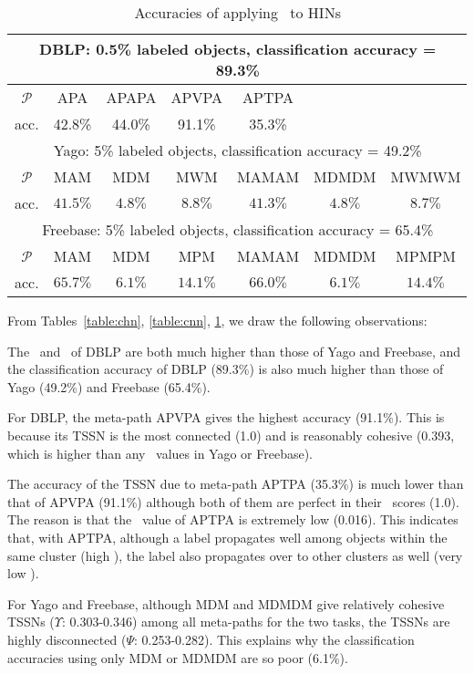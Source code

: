 \begin{table}
\caption{Accuracies of applying \gm\ to HINs}
\centering
\tiny
\begin{tabular}{|c|c|c|c|c|c|c|}  \hline
\multicolumn{7}{|c|}{DBLP: 0.5\% labeled objects, classification accuracy = 89.3\%}  \\ \hline
$\mathcal{P}$ & APA & APAPA & APVPA & APTPA  & & \\ \hline
acc. &42.8\% &44.0\% & 91.1\% & 35.3\% & & \\ \hline \hline
\multicolumn{7}{|c|}{Yago: 5\% labeled objects, classification accuracy = 49.2\%}  \\ \hline
$\mathcal{P}$ & MAM & MDM & MWM & MAMAM  & MDMDM & MWMWM  \\ \hline
acc. & $41.5\%$ & $4.8\%$ & $8.8\%$ & $41.3\%$ & $4.8\%$ & $8.7\%$  \\ \hline \hline
\multicolumn{7}{|c|}{Freebase: 5\% labeled objects, classification accuracy = 65.4\%}  \\ \hline
$\mathcal{P}$ & MAM & MDM & MPM & MAMAM & MDMDM & MPMPM \\ \hline
acc. &  $65.7\%$ & $6.1\%$ & $14.1\%$ & $66.0\%$ & $6.1\%$ & $14.4\%$ \\ \hline
\end{tabular}
\label{table:acc}
\end{table}

From Tables~\ref{table:chn}, \ref{table:cnn}, \ref{table:acc}, we draw the following observations:

 The \chn\ and \cnn\ of DBLP are both much higher than those of Yago and Freebase, and
the classification accuracy of DBLP (89.3\%) is also much higher than those of Yago (49.2\%) and Freebase (65.4\%).

 For DBLP, the meta-path APVPA gives the highest accuracy (91.1\%). This is because its TSSN is the most
connected (1.0) and is reasonably cohesive (0.393, which is higher than any \chn\ values in Yago or Freebase).

 The accuracy of the TSSN due to meta-path APTPA (35.3\%) is much lower than that of APVPA (91.1\%) although 
both of them are perfect in their \cnn\ scores (1.0). The reason is that the \chn\ value of APTPA is
extremely low (0.016). This indicates that, with APTPA, although a label propagates well among objects within the same
cluster (high \cnn), the label also propagates over to other clusters as well (very low \chn).

 For Yago and Freebase, although MDM and MDMDM give relatively cohesive TSSNs ($\Upsilon$: 0.303-0.346)
among all meta-paths for the two tasks,
the TSSNs are highly disconnected ($\Psi$: 0.253-0.282).
This explains why the classification accuracies using only MDM or MDMDM are so poor (6.1\%).

